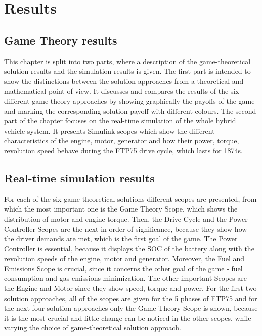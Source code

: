 \chapter{Results}
\label{chp:results}

\section{Game Theory results}
This chapter is split into two parts, where a description of the game-theoretical solution results and the simulation results is given. The first part is intended to show the distinctions between the solution approaches from a theoretical and mathematical point of view. It discusses and compares the results of the six different game theory approaches by showing graphically the payoffs of the game and marking the corresponding solution payoff with different colours. The second part of the chapter focuses on the real-time simulation of the whole hybrid vehicle system. It presents Simulink scopes which show the different characteristics of the engine, motor, generator and how their power, torque, revolution speed behave during the FTP75 drive cycle, which lasts for 1874s.

\section{Real-time simulation results}

For each of the six game-theoretical solutions different scopes are presented, from which the most important one is the Game Theory Scope, which shows the distribution of motor and engine torque. Then, the Drive Cycle and the Power Controller Scopes are the next in order of significance, because they show how the driver demands are met, which is the first goal of the game. The Power Controller is essential, because it displays the SOC of the battery along with the revolution speeds of the engine, motor and generator. Moreover, the Fuel and Emissions Scope is crucial, since it concerns the other goal of the game - fuel consumption and gas emissions minimization. The other important Scopes are the Engine and Motor since they show speed, torque and power. For the first two solution approaches, all of the scopes are given for the 5 phases of FTP75 and for the next four solution approaches only the Game Theory Scope is shown, because it is the most crucial and little change can be noticed in the other scopes, while varying the choice of game-theoretical solution approach.

